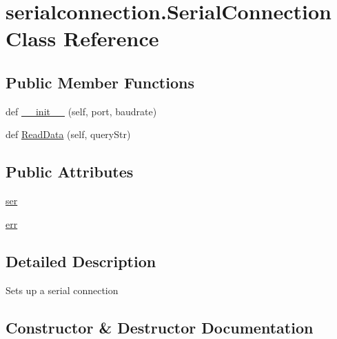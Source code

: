 \hypertarget{classserialconnection_1_1SerialConnection}{}\section{serialconnection.\+Serial\+Connection Class Reference}
\label{classserialconnection_1_1SerialConnection}
\subsection*{Public Member Functions}
\begin{DoxyCompactItemize}
\item 
def \hyperlink{classserialconnection_1_1SerialConnection_ad1515dd3aa20eaa90bd30534a6c43f8e}{\+\_\+\+\_\+init\+\_\+\+\_\+} (self, port, baudrate)
\item 
def \hyperlink{classserialconnection_1_1SerialConnection_ad49c59c39c57ee1424e797fb667f18f5}{Read\+Data} (self, query\+Str)
\end{DoxyCompactItemize}
\subsection*{Public Attributes}
\begin{DoxyCompactItemize}
\item 
\hyperlink{classserialconnection_1_1SerialConnection_a5b2f2670cc97ed8970dadd829f623d66}{ser}
\item 
\hyperlink{classserialconnection_1_1SerialConnection_a074a88ccb2c22fc8f81a98c15dfdffe4}{err}
\end{DoxyCompactItemize}


\subsection{Detailed Description}
\begin{DoxyVerb}Sets up a serial connection\end{DoxyVerb}
 

\subsection{Constructor \& Destructor Documentation}
